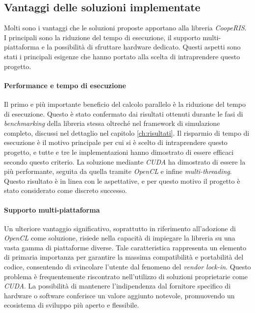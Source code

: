 \subsection{Vantaggi delle soluzioni implementate}
\label{subsec:vantaggi}

Molti sono i vantaggi che le soluzioni proposte apportano alla libreria \textit{CoopeRIS}.
I principali sono la riduzione del tempo di esecuzione, il supporto multi-piattaforma
e la possibilità di sfruttare hardware dedicato. Questi aspetti sono stati i
principali esigenze che hanno portato alla scelta di intraprendere questo
progetto.

\paragraph{Performance e tempo di esecuzione}
\label{para:performance}

Il primo e più importante beneficio del calcolo parallelo è la riduzione del
tempo di esecuzione. Questo è stato confermato dai risultati ottenuti durante le
fasi di \textit{benchmarking} della libreria stessa oltreché nel framework di
simulazione completo, discussi nel dettaglio nel capitolo \ref{ch:risultati}. Il
risparmio di tempo di esecuzione è il motivo principale per cui si è scelto di
intraprendere questo progetto, e tutte e tre le implementazioni hanno dimostrato
di essere efficaci secondo questo criterio. La soluzione mediante \textit{CUDA} ha
dimostrato di essere la più performante, seguita da quella tramite \textit{OpenCL}
e infine \textit{multi-threading}. Questo risultato è in linea con le aspettative,
e per questo motivo il progetto è stato considerato come discreto successo.

\paragraph{Supporto multi-piattaforma}
\label{para:supporto}

Un ulteriore vantaggio significativo, soprattutto in riferimento all'adozione di
\textit{OpenCL} come soluzione, risiede nella capacità di impiegare la libreria su
una vasta gamma di piattaforme diverse. Tale caratteristica rappresenta un
elemento di primaria importanza per garantire la massima compatibilità e
portabilità del codice, consentendo di svincolare l'utente dal fenomeno del \textit{vendor
lock-in}. Questo problema è frequentemente riscontrato nell'utilizzo di soluzioni
proprietarie come \textit{CUDA}. La possibilità di mantenere l'indipendenza dal fornitore
specifico di hardware o software conferisce un valore aggiunto notevole,
promuovendo un ecosistema di sviluppo più aperto e flessibile.

